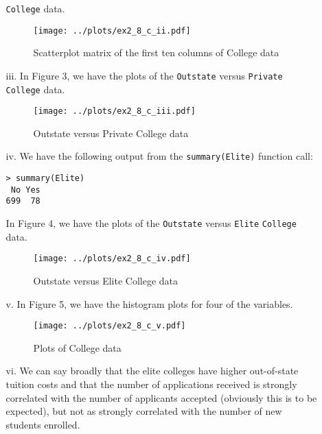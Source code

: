 \begin{itemize}
\begin{itemize}
        \verb|College| data.
        \begin{figure}[!ht]
            \texttt{[image: ../plots/ex2\_8\_c\_ii.pdf]}
            \caption{Scatterplot matrix of the first ten columns of College data}
        \end{figure}
        \item[iii.] In Figure 3, we have the plots of the \verb|Outstate| versus 
        \verb|Private| \verb|College| data.
        \begin{figure}[!ht]
            \texttt{[image: ../plots/ex2\_8\_c\_iii.pdf]}
            \caption{Outstate versus Private College data}
        \end{figure}
        \item[iv.] We have the following output from the \verb|summary(Elite)| function call:
        \begin{verbatim}
> summary(Elite)
 No Yes 
699  78 
        \end{verbatim}
        In Figure 4, we have the plots of the \verb|Outstate| versus 
        \verb|Elite| \verb|College| data.
        \begin{figure}[!ht]
            \texttt{[image: ../plots/ex2\_8\_c\_iv.pdf]}
            \caption{Outstate versus Elite College data}
        \end{figure}
        \item[v.] In Figure 5, we have the histogram plots for four of the variables.
        \begin{figure}[!ht]
            \texttt{[image: ../plots/ex2\_8\_c\_v.pdf]}
            \caption{Plots of College data}
        \end{figure}
        \item[vi.] We can say broadly that the elite colleges have higher out-of-state tuition 
        costs and that the number of applications received is strongly correlated with the
        number of applicants accepted (obviously this is to be expected), but not as strongly
        correlated with the number of new students enrolled.
    \end{itemize}
\end{itemize}
